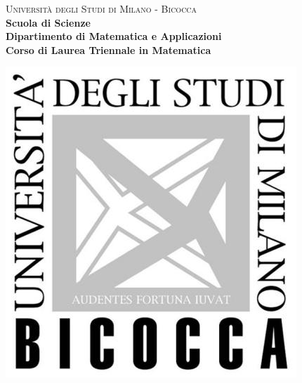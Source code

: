     \begin{titlepage}
	
	\centering
	
	\begin{minipage}[t]{1\textwidth}
		\centering
		{
			{\LARGE\textsc{Università degli Studi di Milano - Bicocca}} \\
			\Large\textbf{Scuola di Scienze} \\
			\large\textbf{Dipartimento di Matematica e Applicazioni} \\
			\textbf{Corso di Laurea Triennale in Matematica} \\
			\par
		}
	\end{minipage}
	
	\centering
	\begin{minipage}[t]{\textwidth}
		\vspace{10mm}
	\end{minipage}
	
	\centering
	\begin{minipage}[t]{1\textwidth}
		\centering
		\includegraphics{Immagini/logo_unimib.jpg}
	\end{minipage}
	
	\begin{minipage}[t]{\textwidth}
	\end{minipage}
	
	\vspace{10mm}
	

\end{titlepage}
